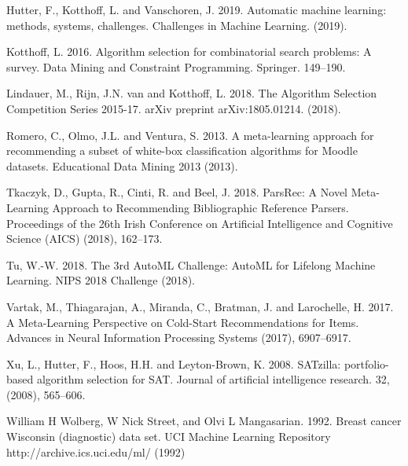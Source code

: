 \documentclass{article}
\begin{document}
\begin{thebibliography}{9}
Hutter, F., Kotthoff, L. and Vanschoren, J. 2019. Automatic machine learning: methods, systems, challenges. Challenges in Machine Learning. (2019).

Kotthoff, L. 2016. Algorithm selection for combinatorial search problems: A survey. Data Mining and Constraint Programming. Springer. 149–190.

Lindauer, M., Rijn, J.N. van and Kotthoff, L. 2018. The Algorithm Selection Competition Series 2015-17. arXiv preprint arXiv:1805.01214. (2018).

Romero, C., Olmo, J.L. and Ventura, S. 2013. A meta-learning approach for recommending a subset of white-box classification algorithms for Moodle datasets. Educational Data Mining 2013 (2013).

Tkaczyk, D., Gupta, R., Cinti, R. and Beel, J. 2018. ParsRec: A Novel Meta-Learning Approach to Recommending Bibliographic Reference Parsers. Proceedings of the 26th Irish Conference on Artificial Intelligence and Cognitive Science (AICS) (2018), 162–173.

Tu, W.-W. 2018. The 3rd AutoML Challenge: AutoML for Lifelong Machine Learning. NIPS 2018 Challenge (2018).

Vartak, M., Thiagarajan, A., Miranda, C., Bratman, J. and Larochelle, H. 2017. A Meta-Learning Perspective on Cold-Start Recommendations for Items. Advances in Neural Information Processing Systems (2017), 6907–6917.

Xu, L., Hutter, F., Hoos, H.H. and Leyton-Brown, K. 2008. SATzilla: portfolio-based algorithm selection for SAT. Journal of artificial intelligence research. 32, (2008), 565–606.

William H Wolberg, W Nick Street, and Olvi L Mangasarian. 1992. Breast cancer Wisconsin (diagnostic) data set. UCI Machine Learning Repository {http://archive.ics.uci.edu/ml/} (1992)

\end{thebibliography}



\end{document}
